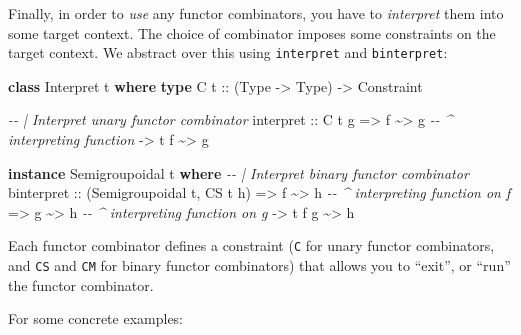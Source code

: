 \documentclass[]{article}
\newenvironment{Shaded}{}{}
\newcommand{\CommentTok}[1]{\textcolor[rgb]{0.38,0.63,0.69}{\textit{#1}}}
\newcommand{\DataTypeTok}[1]{\textcolor[rgb]{0.56,0.13,0.00}{#1}}
\newcommand{\KeywordTok}[1]{\textcolor[rgb]{0.00,0.44,0.13}{\textbf{#1}}}
\newcommand{\NormalTok}[1]{#1}
\newcommand{\OperatorTok}[1]{\textcolor[rgb]{0.40,0.40,0.40}{#1}}
\newcommand{\OtherTok}[1]{\textcolor[rgb]{0.00,0.44,0.13}{#1}}
\begin{document}
Finally, in order to \emph{use} any functor combinators, you have to
\emph{interpret} them into some target context. The choice of combinator imposes
some constraints on the target context. We abstract over this using
\texttt{interpret} and \texttt{binterpret}:

\begin{Shaded}
\begin{Highlighting}[]
\KeywordTok{class} \DataTypeTok{Interpret}\NormalTok{ t }\KeywordTok{where}
    \KeywordTok{type} \DataTypeTok{C}\OtherTok{ t ::}\NormalTok{ (}\DataTypeTok{Type} \OtherTok{{-}>} \DataTypeTok{Type}\NormalTok{) }\OtherTok{{-}>} \DataTypeTok{Constraint}

    \CommentTok{{-}{-} | Interpret unary functor combinator}
\NormalTok{    interpret}
\OtherTok{        ::} \DataTypeTok{C}\NormalTok{ t g}
        \OtherTok{=>}\NormalTok{ f }\OperatorTok{\textasciitilde{}>}\NormalTok{ g             }\CommentTok{{-}{-} \^{} interpreting function}
        \OtherTok{{-}>}\NormalTok{ t f }\OperatorTok{\textasciitilde{}>}\NormalTok{ g}

\KeywordTok{instance} \DataTypeTok{Semigroupoidal}\NormalTok{ t }\KeywordTok{where}
    \CommentTok{{-}{-} | Interpret binary functor combinator}
\NormalTok{    binterpret}
\OtherTok{        ::}\NormalTok{ (}\DataTypeTok{Semigroupoidal}\NormalTok{ t, }\DataTypeTok{CS}\NormalTok{ t h)}
        \OtherTok{=>}\NormalTok{ f }\OperatorTok{\textasciitilde{}>}\NormalTok{ h             }\CommentTok{{-}{-} \^{} interpreting function on f}
        \OtherTok{=>}\NormalTok{ g }\OperatorTok{\textasciitilde{}>}\NormalTok{ h             }\CommentTok{{-}{-} \^{} interpreting function on g}
        \OtherTok{{-}>}\NormalTok{ t f g }\OperatorTok{\textasciitilde{}>}\NormalTok{ h}
\end{Highlighting}
\end{Shaded}

Each functor combinator defines a constraint (\texttt{C} for unary functor
combinators, and \texttt{CS} and \texttt{CM} for binary functor combinators)
that allows you to ``exit'', or ``run'' the functor combinator.

For some concrete examples:
\end{document}
